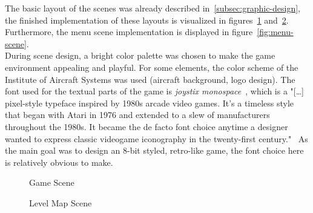 The basic layout of the scenes was already described in~\ref{subsec:graphic-design}, the finished implementation of these
layouts is visualized in figures~\ref{fig:game-scene} and~\ref{fig:level-scene}.
Furthermore, the menu scene implementation is displayed in figure~\ref{fig:menu-scene}.
\\
During scene design, a bright color palette was chosen to make the game environment appealing and playful.
For some elements, the color scheme of the Institute of Aircraft Systems was used (aircraft background, logo design).
The font used for the textual parts of the game is \textit{joystix monospace}~\cite{joystix}, which is a "[\ldots] pixel-style
typeface inspired by 1980s arcade video games.
It's a timeless style that began with Atari in 1976 and extended to a slew of manufacturers throughout the 1980s.
It became the de facto font choice anytime a designer wanted to express classic videogame iconography in the twenty-first century."~\cite{joystix}
As the main goal was to design an 8-bit styled, retro-like game, the font choice here is relatively obvious to make.
\begin{figure}
    \centering
    \setlength{\fboxsep}{1pt}
    \setlength{\fboxrule}{1pt}
    \caption{Game Scene}
    \label{fig:game-scene}
\end{figure}

\begin{figure}
    \centering
    \setlength{\fboxsep}{1pt}
    \setlength{\fboxrule}{1pt}
    \caption{Level Map Scene}
    \label{fig:level-scene}
\end{figure}

